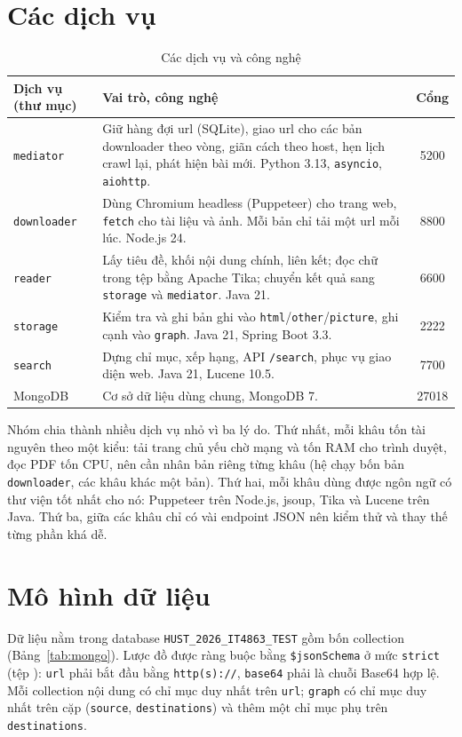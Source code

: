 \documentclass[12pt,a4paper]{report}
\begin{document}
\section{Các dịch vụ}

\begin{table}[ht]
\centering
\caption{Các dịch vụ và công nghệ}\label{tab:services}
\begin{tabularx}{\textwidth}{l L c}
\toprule
Dịch vụ (thư mục) & Vai trò, công nghệ & Cổng \\
\midrule
\texttt{mediator} & Giữ hàng đợi url (SQLite), giao url cho các bản downloader theo vòng, giãn cách theo host, hẹn lịch crawl lại, phát hiện bài mới. Python 3.13, \texttt{asyncio}, \texttt{aiohttp}. & 5200 \\
\texttt{downloader} & Dùng Chromium headless (Puppeteer) cho trang web, \texttt{fetch} cho tài liệu và ảnh. Mỗi bản chỉ tải một url mỗi lúc. Node.js 24. & 8800 \\
\texttt{reader} & Lấy tiêu đề, khối nội dung chính, liên kết; đọc chữ trong tệp bằng Apache Tika; chuyển kết quả sang \texttt{storage} và \texttt{mediator}. Java 21. & 6600 \\
\texttt{storage} & Kiểm tra và ghi bản ghi vào \texttt{html}/\texttt{other}/\texttt{picture}, ghi cạnh vào \texttt{graph}. Java 21, Spring Boot 3.3. & 2222 \\
\texttt{search} & Dựng chỉ mục, xếp hạng, API \texttt{/search}, phục vụ giao diện web. Java 21, Lucene 10.5. & 7700 \\
MongoDB & Cơ sở dữ liệu dùng chung, MongoDB 7. & 27018 \\
\bottomrule
\end{tabularx}
\end{table}

Nhóm chia thành nhiều dịch vụ nhỏ vì ba lý do. Thứ nhất, mỗi khâu tốn tài nguyên theo một kiểu: tải trang chủ yếu chờ
mạng và tốn RAM cho trình duyệt, đọc PDF tốn CPU, nên cần nhân bản riêng từng khâu (hệ chạy bốn bản
\texttt{downloader}, các khâu khác một bản). Thứ hai, mỗi khâu dùng được ngôn ngữ có thư viện tốt nhất cho nó:
Puppeteer trên Node.js, jsoup, Tika và Lucene trên Java. Thứ ba, giữa các khâu chỉ có vài endpoint JSON nên kiểm thử
và thay thế từng phần khá dễ.

\section{Mô hình dữ liệu}

Dữ liệu nằm trong database \texttt{HUST\_\allowbreak{}2026\_\allowbreak{}IT4863\_\allowbreak{}TEST} gồm bốn collection (Bảng~\ref{tab:mongo}). Lược đồ được
ràng buộc bằng \texttt{\$jsonSchema} ở mức \texttt{strict} (tệp ):
\texttt{url} phải bắt đầu bằng \texttt{http(s)://}, \texttt{base64} phải là chuỗi Base64 hợp lệ. Mỗi collection nội
dung có chỉ mục duy nhất trên \texttt{url}; \texttt{graph} có chỉ mục duy nhất trên cặp
(\texttt{source}, \texttt{destinations}) và thêm một chỉ mục phụ trên \texttt{destinations}.
\end{document}
